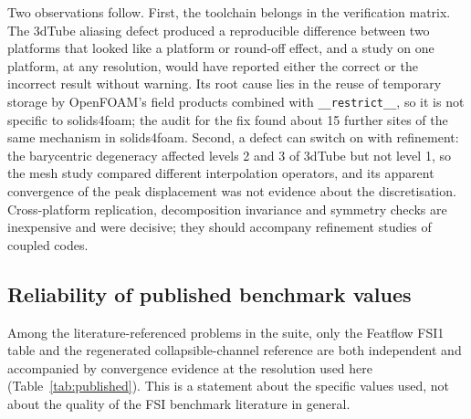 Two observations follow.
First, the toolchain belongs in the verification matrix.
The 3dTube aliasing defect produced a reproducible difference between two platforms that looked like a platform or round-off effect, and a study on one platform, at any resolution, would have reported either the correct or the incorrect result without warning.
Its root cause lies in the reuse of temporary storage by OpenFOAM's field products combined with \texttt{\_\_restrict\_\_}, so it is not specific to solids4foam; the audit for the fix found about 15 further sites of the same mechanism in solids4foam.
Second, a defect can switch on with refinement: the barycentric degeneracy affected levels 2 and 3 of 3dTube but not level 1, so the mesh study compared different interpolation operators, and its apparent convergence of the peak displacement was not evidence about the discretisation.
Cross-platform replication, decomposition invariance and symmetry checks are inexpensive and were decisive; they should accompany refinement studies of coupled codes.

\subsection{Reliability of published benchmark values}\label{sec:published_reliability}

Among the literature-referenced problems in the suite, only the Featflow FSI1 table and the regenerated collapsible-channel reference are both independent and accompanied by convergence evidence at the resolution used here (Table~\ref{tab:published}).
This is a statement about the specific values used, not about the quality of the FSI benchmark literature in general.

